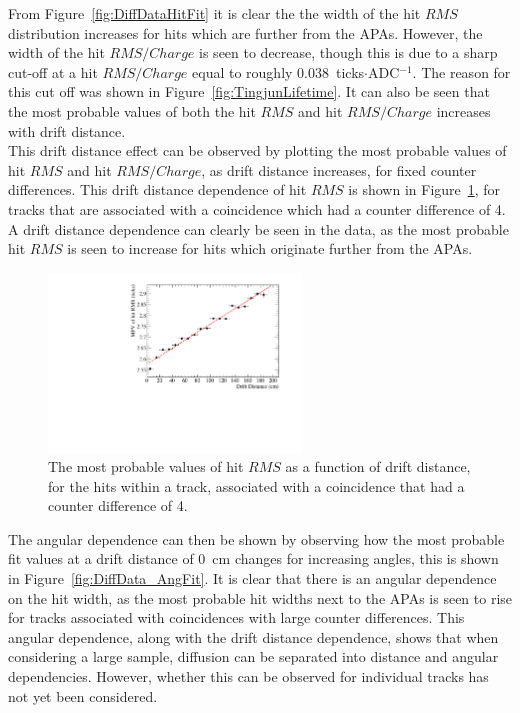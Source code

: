 From Figure~\ref{fig:DiffDataHitFit} it is clear the the width of the hit $RMS$ distribution increases for hits which are further from the APAs. However, the width of the hit $RMS/Charge$ is seen to decrease, though this is due to a sharp cut-off at a hit $RMS/Charge$ equal to roughly 0.038~ticks$\cdot$ADC$^{-1}$. The reason for this cut off was shown in Figure~\ref{fig:TingjunLifetime}. It can also be seen that the most probable values of both the hit $RMS$ and hit $RMS/Charge$ increases with drift distance. \\

This drift distance effect can be observed by plotting the most probable values of hit $RMS$ and hit $RMS/Charge$, as drift distance increases, for fixed counter differences. This drift distance dependence of hit $RMS$ is shown in Figure~\ref{fig:CDiff4DataFit}, for tracks that are associated with a coincidence which had a counter difference of 4. A drift distance dependence can clearly be seen in the data, as the most probable hit $RMS$ is seen to increase for hits which originate further from the APAs. \\

\begin{figure}
  \centering
  \includegraphics[width=0.6\textwidth]{CounterDiff4_Data}
  \caption[The drift distance dependence of diffusion in the 35 ton dataset for coincidences with a counter difference of 4]
          {The most probable values of hit $RMS$ as a function of drift distance, for the hits within a track, associated with a coincidence that had a counter difference of 4.}
  \label{fig:CDiff4DataFit}
\end{figure}

The angular dependence can then be shown by observing how the most probable fit values at a drift distance of 0~cm changes for increasing angles, this is shown in Figure~\ref{fig:DiffData_AngFit}. It is clear that there is an angular dependence on the hit width, as the most probable hit widths next to the APAs is seen to rise for tracks associated with coincidences with large counter differences. This angular dependence, along with the drift distance dependence, shows that when considering a large sample, diffusion can be separated into distance and angular dependencies. However, whether this can be observed for individual tracks has not yet been considered. \\

